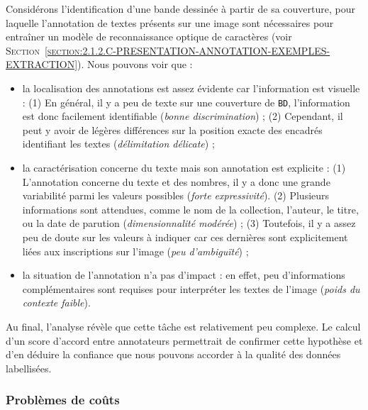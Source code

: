 			\begin{leftBarExamples}
				Considérons l'identification d'une bande dessinée à partir de sa couverture, pour laquelle l'annotation de textes présents sur une image sont nécessaires pour entraîner un modèle de reconnaissance optique de caractères (voir \textsc{Section~\ref{section:2.1.2.C-PRESENTATION-ANNOTATION-EXEMPLES-EXTRACTION}}).
				Nous pouvons voir que :
				\begin{itemize}
					\item la localisation des annotations est assez évidente car l'information est visuelle : 
					(1) En général, il y a peu de texte sur une couverture de \texttt{BD}, l'information est donc facilement identifiable (\textit{bonne discrimination}) ;
					(2) Cependant, il peut y avoir de légères différences sur la position exacte des encadrés identifiant les textes (\textit{délimitation délicate}) ;
					\item la caractérisation concerne du texte mais son annotation est explicite :
					(1) L'annotation concerne du texte et des nombres, il y a donc une grande variabilité parmi les valeurs possibles (\textit{forte expressivité}).
					(2) Plusieurs informations sont attendues, comme le nom de la collection, l'auteur, le titre, ou la date de parution (\textit{dimensionnalité modérée}) ;
					(3) Toutefois, il y a assez peu de doute sur les valeurs à indiquer car ces dernières sont explicitement liées aux inscriptions sur l'image (\textit{peu d'ambiguïté}) ;
					\item la situation de l'annotation n'a pas d'impact :
					en effet, peu d'informations complémentaires sont requises pour interpréter les textes de l'image (\textit{poids du contexte faible}).
				\end{itemize}
				Au final, l'analyse révèle que cette tâche est relativement peu complexe.
				Le calcul d'un score d'accord entre annotateurs permettrait de confirmer cette hypothèse et d'en déduire la confiance que nous pouvons accorder à la qualité des données labellisées.
			\end{leftBarExamples}
			
			
		\subsubsection{Problèmes de coûts}
		\label{section:2.3.2.C-DEFIS-ANNOTATION-ASPECT-COMPLEXITE-COUTS}
		
